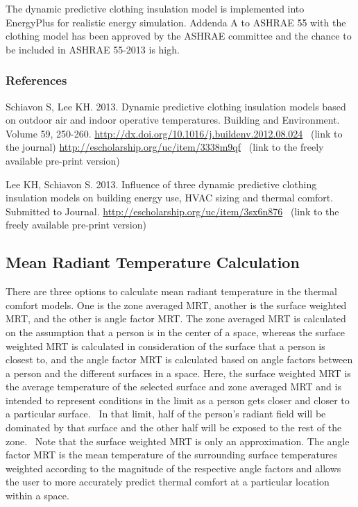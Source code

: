The dynamic predictive clothing insulation model is implemented into EnergyPlus for realistic energy simulation. Addenda A to ASHRAE 55 with the clothing model has been approved by the ASHRAE committee and the chance to be included in ASHRAE 55-2013 is high.

\subsubsection{References}\label{references-033}

Schiavon S, Lee KH. 2013. Dynamic predictive clothing insulation models based on outdoor air and indoor operative temperatures. Building and Environment. Volume 59, 250-260. \url{http://dx.doi.org/10.1016/j.buildenv.2012.08.024} ~(link to the journal) \url{http://escholarship.org/uc/item/3338m9qf} ~(link to the freely available pre-print version)

Lee KH, Schiavon S. 2013. Influence of three dynamic predictive clothing insulation models on building energy use, HVAC sizing and thermal comfort. Submitted to Journal. \url{http://escholarship.org/uc/item/3sx6n876}~ (link to the freely available pre-print version)

\subsection{Mean Radiant Temperature Calculation}\label{mean-radiant-temperature-calculation}

There are three options to calculate mean radiant temperature in the thermal comfort models. One is the zone averaged MRT, another is the surface weighted MRT, and the other is angle factor MRT. The zone averaged MRT is calculated on the assumption that a person is in the center of a space, whereas the surface weighted MRT is calculated in consideration of the surface that a person is closest to, and the angle factor MRT is calculated based on angle factors between a person and the different surfaces in a space. Here, the surface weighted MRT is the average temperature of the selected surface and zone averaged MRT and is intended to represent conditions in the limit as a person gets closer and closer to a particular surface.~ In that limit, half of the person's radiant field will be dominated by that surface and the other half will be exposed to the rest of the zone.~ Note that the surface weighted MRT is only an approximation. The angle factor MRT is the mean temperature of the surrounding surface temperatures weighted according to the magnitude of the respective angle factors and allows the user to more accurately predict thermal comfort at a particular location within a space.

